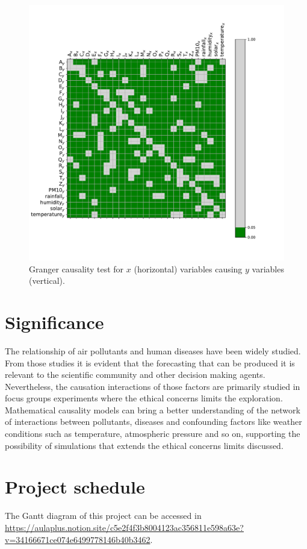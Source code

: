 \documentclass[
  11pt,
  a4paper,
  oneside
]{article}
\begin{document}
\begin{figure}
    \includegraphics[trim={0 0 0 4em}, clip, width=1\textwidth]{figs/2018_granger.pdf}
    \caption{Granger causality test for $x$ (horizontal) variables causing $y$ variables (vertical).}
    \label{fig:granger_test}
\end{figure}

\section{Significance}
The relationship of air pollutants and human diseases have been widely studied. From those studies it is evident that the forecasting that can be produced it is relevant to the scientific community and other decision making agents. Nevertheless, the causation interactions of those factors are primarily studied in focus groups experiments where the ethical concerns limits the exploration. Mathematical causality models can bring a better understanding of the network of interactions between pollutants, diseases and confounding factors like weather conditions such as temperature, atmospheric pressure and so on, supporting the possibility of simulations that extends the ethical concerns limits discussed.

\section{Project schedule}
\begin{sloppypar}
The Gantt diagram of this project can be accessed in  \url{https://aulaplus.notion.site/c5e2f4f3b8004123ac356811e598a63e?v=34166671ce074e6499778146b40b3462}.
\end{sloppypar}


\end{document}

